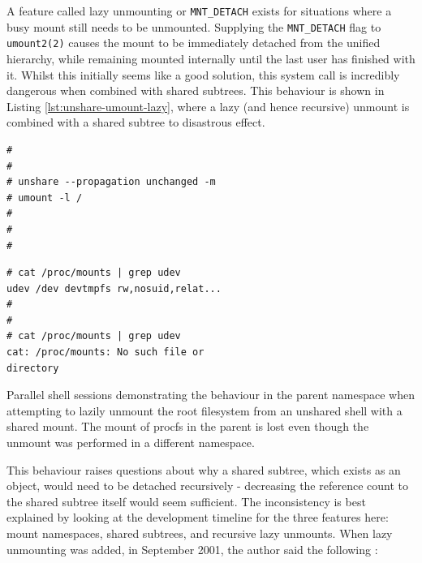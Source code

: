 \documentclass[12pt,a4paper,twoside]{report}
\begin{document}
A feature called lazy unmounting or \texttt{MNT\_DETACH} exists for situations where a busy mount still needs to be unmounted. Supplying the \texttt{MNT\_DETACH} flag to \texttt{umount2(2)} causes the mount to be immediately detached from the unified hierarchy, while remaining mounted internally until the last user has finished with it. Whilst this initially seems like a good solution, this system call is incredibly dangerous when combined with shared subtrees. This behaviour is shown in Listing \ref{lst:unshare-umount-lazy}, where a lazy (and hence recursive) unmount is combined with a shared subtree to disastrous effect.

\begin{listing}
\begin{minipage}{.49\textwidth}

\begin{verbatim}
#
#
# unshare --propagation unchanged -m
# umount -l /
#
#
#
\end{verbatim}

\end{minipage}
\hfill
\begin{minipage}{.49\textwidth}

\begin{verbatim}
# cat /proc/mounts | grep udev
udev /dev devtmpfs rw,nosuid,relat...
#
#
# cat /proc/mounts | grep udev
cat: /proc/mounts: No such file or
directory
\end{verbatim}

\end{minipage}

\caption{Parallel shell sessions demonstrating the behaviour in the parent namespace when attempting to lazily unmount the root filesystem from an unshared shell with a shared mount. The mount of procfs in the parent is lost even though the unmount was performed in a different namespace.}
\label{lst:unshare-umount-lazy}
\end{listing}

This behaviour raises questions about why a shared subtree, which exists as an object, would need to be detached recursively - decreasing the reference count to the shared subtree itself would seem sufficient. The inconsistency is best explained by looking at the development timeline for the three features here: mount namespaces, shared subtrees, and recursive lazy unmounts. When lazy unmounting was added, in September 2001, the author said the following \citep{viro_patch_2001}:

\end{document}
